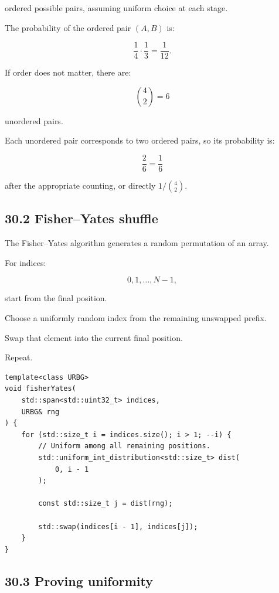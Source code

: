 ordered possible pairs, assuming uniform choice at each stage.

The probability of the ordered pair \((A,B)\) is:

\[ \frac14\cdot\frac13=\frac1{12}. \]

If order does not matter, there are:

\[ \binom42=6 \]

unordered pairs.

Each unordered pair corresponds to two ordered pairs, so its probability is:

\[ \frac26=\frac16 \]

after the appropriate counting, or directly \(1/\binom42\).

\subsection{30.2 Fisher--Yates shuffle}\label{02-foundations-ii-ch031-fisheryates-shuffle}

\hypertarget{02-foundations-ii-ch031-fisheryates-shuffle}{}

The Fisher--Yates algorithm generates a random permutation of an array.

For indices:

\[ 0,1,\ldots,N-1, \]

start from the final position.

Choose a uniformly random index from the remaining unswapped prefix.

Swap that element into the current final position.

Repeat.

\begin{verbatim}
template<class URBG>
void fisherYates(
    std::span<std::uint32_t> indices,
    URBG& rng
) {
    for (std::size_t i = indices.size(); i > 1; --i) {
        // Uniform among all remaining positions.
        std::uniform_int_distribution<std::size_t> dist(
            0, i - 1
        );

        const std::size_t j = dist(rng);

        std::swap(indices[i - 1], indices[j]);
    }
}
\end{verbatim}

\subsection{30.3 Proving uniformity}\label{02-foundations-ii-ch031-proving-uniformity}

